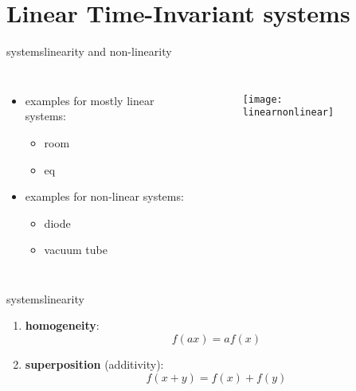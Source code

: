     \section[LTI]{Linear Time-Invariant systems}
        \begin{frame}{systems}{linearity and non-linearity}
            \begin{columns}
            \begin{itemize}
                \item   examples for mostly linear systems:
                    \begin{itemize}
                        \item   room
                        \item   eq
                    \end{itemize}
                \bigskip
                \item   examples for non-linear systems:
                    \begin{itemize}
                        \item   diode
                        \item   vacuum tube
                    \end{itemize}
            \end{itemize}
            \begin{figure}%
                \texttt{[image: linearnonlinear]}%
            \end{figure}
            \end{columns}

        \end{frame}
        \begin{frame}{systems}{linearity}
            
            \begin{enumerate}
                \item   \textbf{homogeneity}:
                    \[f(ax) = a f(x)\]
                \bigskip
                \item   \textbf{superposition} (additivity):
                \[f(x+y) = f(x) + f(y)\]
            \end{enumerate}
        \end{frame}
